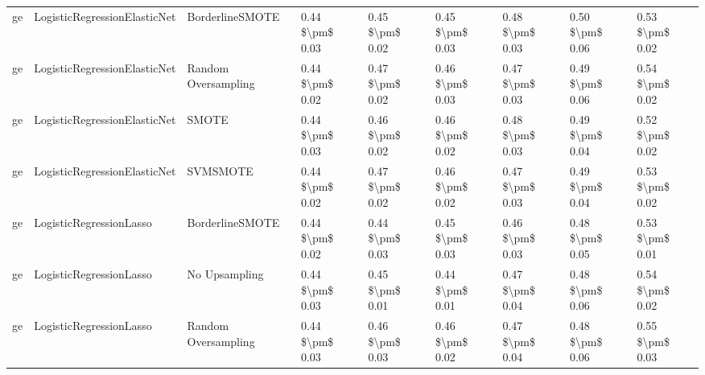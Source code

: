 \begin{tabular}{lllllllll}
      ge &    LogisticRegressionElasticNet &               BorderlineSMOTE & 0.44 \$\textbackslash pm\$ 0.03 &           0.45 \$\textbackslash pm\$ 0.02 &       0.45 \$\textbackslash pm\$ 0.03 &        0.48 \$\textbackslash pm\$ 0.03 &                         0.50 \$\textbackslash pm\$ 0.06 &     0.53 \$\textbackslash pm\$ 0.02 \\
      ge &    LogisticRegressionElasticNet &           Random Oversampling & 0.44 \$\textbackslash pm\$ 0.02 &           0.47 \$\textbackslash pm\$ 0.02 &       0.46 \$\textbackslash pm\$ 0.03 &        0.47 \$\textbackslash pm\$ 0.03 &                         0.49 \$\textbackslash pm\$ 0.06 &     0.54 \$\textbackslash pm\$ 0.02 \\
      ge &    LogisticRegressionElasticNet &                         SMOTE & 0.44 \$\textbackslash pm\$ 0.03 &           0.46 \$\textbackslash pm\$ 0.02 &       0.46 \$\textbackslash pm\$ 0.02 &        0.48 \$\textbackslash pm\$ 0.03 &                         0.49 \$\textbackslash pm\$ 0.04 &     0.52 \$\textbackslash pm\$ 0.02 \\
      ge &    LogisticRegressionElasticNet &                      SVMSMOTE & 0.44 \$\textbackslash pm\$ 0.02 &           0.47 \$\textbackslash pm\$ 0.02 &       0.46 \$\textbackslash pm\$ 0.02 &        0.47 \$\textbackslash pm\$ 0.03 &                         0.49 \$\textbackslash pm\$ 0.04 &     0.53 \$\textbackslash pm\$ 0.02 \\
      ge &         LogisticRegressionLasso &               BorderlineSMOTE & 0.44 \$\textbackslash pm\$ 0.02 &           0.44 \$\textbackslash pm\$ 0.03 &       0.45 \$\textbackslash pm\$ 0.03 &        0.46 \$\textbackslash pm\$ 0.03 &                         0.48 \$\textbackslash pm\$ 0.05 &     0.53 \$\textbackslash pm\$ 0.01 \\
      ge &         LogisticRegressionLasso &                 No Upsampling & 0.44 \$\textbackslash pm\$ 0.03 &           0.45 \$\textbackslash pm\$ 0.01 &       0.44 \$\textbackslash pm\$ 0.01 &        0.47 \$\textbackslash pm\$ 0.04 &                         0.48 \$\textbackslash pm\$ 0.06 &     0.54 \$\textbackslash pm\$ 0.02 \\
      ge &         LogisticRegressionLasso &           Random Oversampling & 0.44 \$\textbackslash pm\$ 0.03 &           0.46 \$\textbackslash pm\$ 0.03 &       0.46 \$\textbackslash pm\$ 0.02 &        0.47 \$\textbackslash pm\$ 0.04 &                         0.48 \$\textbackslash pm\$ 0.06 &     0.55 \$\textbackslash pm\$ 0.03 \\

\end{tabular}
